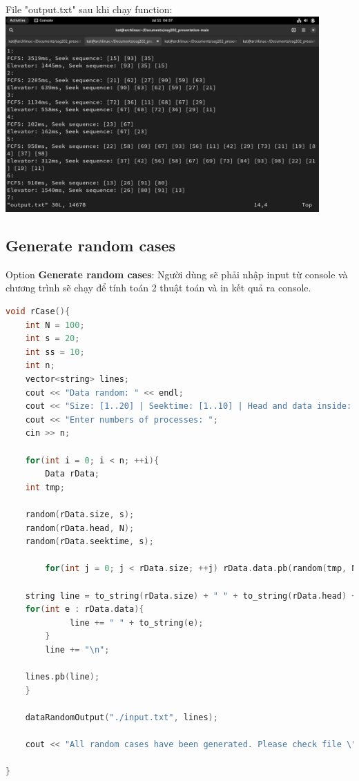 \documentclass{report}
\begin{document}
            File "output.txt" sau khi chạy function:\\
            \includegraphics[width=12cm]{images/outputtxt.png}
                        
        \subsection{Generate random cases}
            
            Option \textbf{Generate random cases}:
            Người dùng sẽ phải nhập input từ console và chương trình sẽ chạy để tính toán 2 thuật toán và in kết quả ra console.

            \begin{lstlisting}[language=C++, caption=Generate random cases Function]
void rCase(){
    int N = 100;
    int s = 20;
    int ss = 10;
    int n;
    vector<string> lines;
    cout << "Data random: " << endl;
    cout << "Size: [1..20] | Seektime: [1..10] | Head and data inside: [1..100]" << endl;;
    cout << "Enter numbers of processes: ";
    cin >> n;

    for(int i = 0; i < n; ++i){
        Data rData;
	int tmp;

	random(rData.size, s);
	random(rData.head, N);
	random(rData.seektime, s);	
 
        for(int j = 0; j < rData.size; ++j) rData.data.pb(random(tmp, N));

	string line = to_string(rData.size) + " " + to_string(rData.head) + " " + to_string(rData.seektime);
   	for(int e : rData.data){
       		 line += " " + to_string(e);
    	}
    	line += "\n";
 
	lines.pb(line);
    }

    dataRandomOutput("./input.txt", lines);

    cout << "All random cases have been generated. Please check file \"input.txt\" to have more infomation." << endl;

}
            \end{lstlisting}
\end{document}
